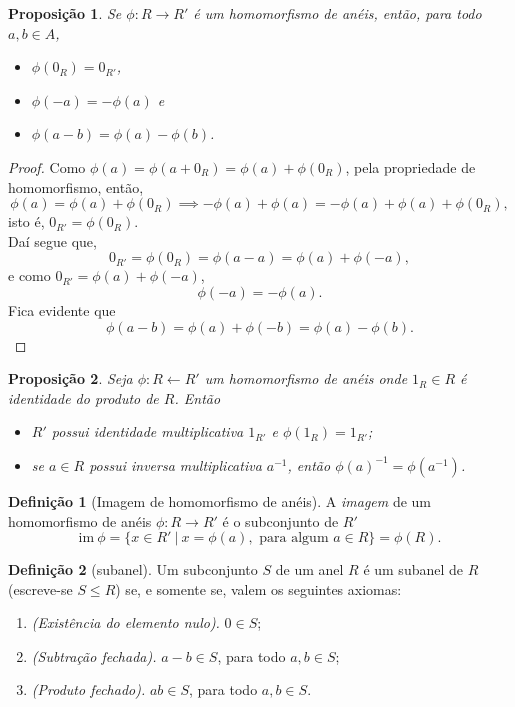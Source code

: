 \documentclass[a4paper,12pt]{article}
\theoremstyle{plain}
\newtheorem{proposicao}{Proposição}[section]
\theoremstyle{definition}
\newtheorem{definicao}{Definição}[section]
\begin{document}
	\begin{proposicao}
		Se $\phi: R \longrightarrow R'$ é um homomorfismo de anéis, então, para todo $a,b\in A$,
		\begin{itemize}
			\item $\phi(0_R) = 0_{R'}$,
			\item $\phi(-a) = -\phi(a)$ e
			\item $\phi(a-b) = \phi(a) - \phi(b)$.
		\end{itemize} 	
	\end{proposicao}
	\begin{proof}
		Como $\phi(a) = \phi(a+0_R) = \phi(a)+\phi(0_R)$, pela propriedade de homomorfismo, então, $$\phi(a) = \phi(a)+\phi(0_R) \implies -\phi(a)+\phi(a) = -\phi(a)+\phi(a)+\phi(0_R),$$ isto é, $0_{R'} = \phi(0_R)$.
	\\
	
		\noindent Daí segue que, $$0_{R'} = \phi(0_R) = \phi(a - a) = \phi(a) + \phi(-a),$$
		e como $0_{R'} = \phi(a) + \phi(-a)$, $$\phi(-a) = -\phi(a).$$
		\noindent Fica evidente que $$\phi(a-b) = \phi(a) + \phi(-b) = \phi(a) - \phi(b).$$
	\end{proof}
	
	\begin{proposicao}
		Seja $\phi:R \longleftarrow	R'$ um homomorfismo de anéis onde $1_R \in R$ é identidade do produto de $R$. Então
		\begin{itemize}
			\item $R'$ possui identidade multiplicativa $1_{R'}$ e $\phi(1_R) = 1_{R'}$;
			\item se $a\in R$ possui inversa multiplicativa $a^{-1}$, então $\phi(a)^{-1} = \phi(a^{-1})$.
		\end{itemize}	
	\end{proposicao}

	\begin{definicao}[Imagem de homomorfismo de anéis]
		A \emph{imagem} de um homomorfismo de anéis
		\(\phi: R\longrightarrow R'\) é o subconjunto de \(R'\)	\[\text{im}\ \phi = \{x\in R' \ |\ x = \phi(a), \text{ para algum } a\in R\} = \phi(R).\]
	\end{definicao}

	\begin{definicao}[subanel]
		Um subconjunto $S$ de um anel $R$ é um subanel de $R$ (escreve-se $S\leq R$) se, e somente se, valem os seguintes axiomas:
		\begin{enumerate}
			\item \emph{(Existência do elemento nulo).} $0 \in S$;
			\item \emph{(Subtração fechada).} $a-b \in S$, para todo $a,b\in S$;
			\item \emph{(Produto fechado).} $ab\in S$, para todo $a,b\in S$.
		\end{enumerate}
	\end{definicao}
\end{document}
